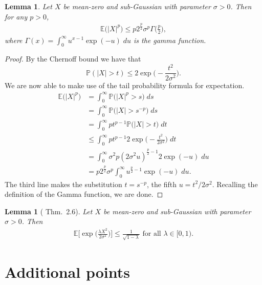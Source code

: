\documentclass[aos]{imsart}
\renewcommand{\Pr}{\mathbb{P}}
\newcommand{\E}{\mathbb{E}}
\newtheorem{lemma}[theorem]{Lemma}
\begin{document}
	\begin{lemma}
	\label{lem:subgmoment}
	Let $X$ be mean-zero and sub-Gaussian with parameter $\sigma>0$. Then for any $p>0$,\begin{align*}
		\E\big(|X|^p\big)\leq p2^{\frac{p}2}\sigma^p \Gamma\Big(\frac{p}2\Big),
	\end{align*}
	where $\Gamma(x) = \int_0^\infty u^{x-1} \exp(-u)\;du$ is the gamma function.
\end{lemma}
\begin{proof}
	By the Chernoff bound we have that \begin{equation*}
		\Pr(|X|>t)\leq 2\exp\bigg(-\frac{t^2}{2\sigma^2}\bigg).
	\end{equation*}
	We are now able to make use of the tail probability formula for expectation.
	\begin{align*}
		\E\big(|X|^p\big) &= \int_0^\infty \Pr\big(|X|^p>s)\;ds\\
		&= \int_0^\infty \Pr\big(|X|>s^{-p})\;ds\\
		&= \int_0^\infty p t^{p-1} \Pr\big(|X|>t)\;dt\\
		&\leq \int_0^\infty p t^{p-1} 2 \exp\bigg(-\frac{t^2}{2\sigma^2}\bigg)\;dt\\
		&= \int_0^\infty \sigma^2 p (2\sigma^2 u)^{\frac{p}2-1} 2\exp(-u)\;du\\
		&= p2^{\frac{p}2}\sigma^p \int_0^\infty u^{\frac{p}2-1} \exp(-u)\;du.
	\end{align*}
	The third line makes the substitution $t=s^{-p}$, the fifth $u=t^2/2\sigma^2$. Recalling the definition of the Gamma function, we are done.
\end{proof}

\begin{lemma}[\cite{WainwrightHighDim} Thm.~2.6]
	\label{lem:subgsquaremgf}
	Let $X$ be mean-zero and sub-Gaussian with parameter $\sigma>0$. Then \begin{align*}
		\E\bigg[\exp\bigg(\frac{\lambda X^2}{2\sigma^2}\bigg)\bigg]\leq \frac1{\sqrt{1-\lambda}} \text{ for all $\lambda\in[0,1)$.}
	\end{align*}
\end{lemma}
	
	
	\section{Additional points}
\end{document}
